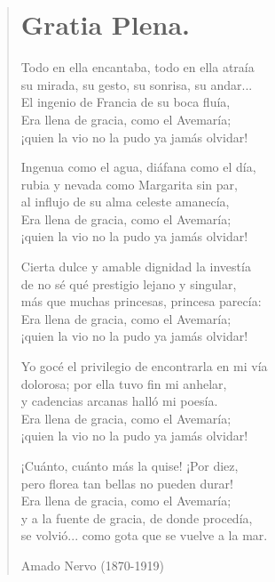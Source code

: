 \documentclass[12pt, twoside]{book}
\begin{document}
\begin{verse}
\begin{center}
\section{Gratia Plena.}
\end{center}
Todo en ella encantaba, todo en ella atraía\\
su mirada, su gesto, su sonrisa, su andar...\\
El ingenio de Francia de su boca fluía,\\
Era llena de gracia, como el Avemaría;\\
¡quien la vio no la pudo ya jamás olvidar!\newline

Ingenua como el agua, diáfana como el día,\\
rubia y nevada como Margarita sin par,\\
al influjo de su alma celeste amanecía,\\
Era llena de gracia, como el Avemaría;\\
¡quien la vio no la pudo ya jamás olvidar!\newline

Cierta dulce y amable dignidad la investía\\
de no sé qué prestigio lejano y singular,\\
más que muchas princesas, princesa parecía:\\
Era llena de gracia, como el Avemaría;\\
¡quien la vio no la pudo ya jamás olvidar!\newline

Yo gocé el privilegio de encontrarla en mi vía\\
dolorosa; por ella tuvo fin mi anhelar,\\
y cadencias arcanas halló mi poesía.\\
Era llena de gracia, como el Avemaría;\\
¡quien la vio no la pudo ya jamás olvidar!\newline

¡Cuánto, cuánto más la quise! ¡Por diez,\\
pero florea tan bellas no pueden durar!\\
Era llena de gracia, como el Avemaría;\\
y a la fuente de gracia, de donde procedía,\\
se volvió... como gota que se vuelve a la mar.\newline

Amado Nervo (1870-1919)
\end{verse}
\newpage
\end{document}
